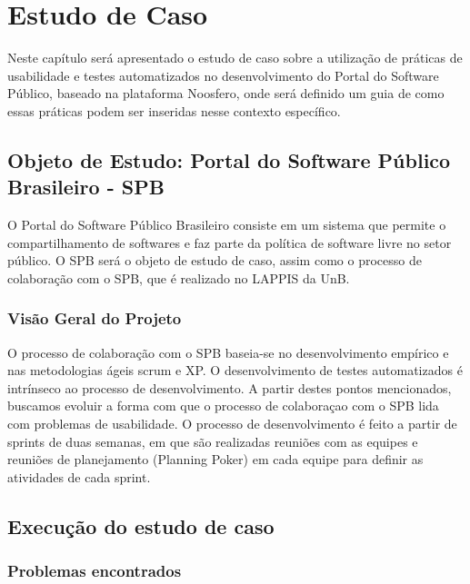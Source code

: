 \chapter{Estudo de Caso}

Neste capítulo será apresentado o estudo de caso sobre a utilização de práticas de usabilidade e testes automatizados no desenvolvimento do Portal do Software Público, baseado na plataforma Noosfero, onde será definido um guia de como essas práticas podem ser inseridas nesse contexto específico.

\section{Objeto de Estudo: Portal do Software Público Brasileiro - SPB}

O Portal do Software Público Brasileiro consiste em um sistema que permite o compartilhamento de softwares e faz parte da política de software livre no setor público.
O SPB será o objeto de estudo de caso, assim como o processo de colaboração com o SPB, que é realizado no LAPPIS da UnB.

\subsection{Visão Geral do Projeto}

O processo de colaboração com o SPB baseia-se no desenvolvimento empírico e nas metodologias ágeis scrum e XP. O desenvolvimento de testes automatizados é intrínseco ao processo de desenvolvimento. A partir destes pontos mencionados, buscamos evoluir a forma com que o processo de colaboraçao com o SPB lida com problemas de usabilidade.
O processo de desenvolvimento é feito a partir de sprints de duas semanas, em que são realizadas reuniões com as equipes e reuniões de planejamento (Planning Poker) em cada equipe para definir as atividades de cada sprint.


\section{Execução do estudo de caso}

\subsection{Problemas encontrados}

